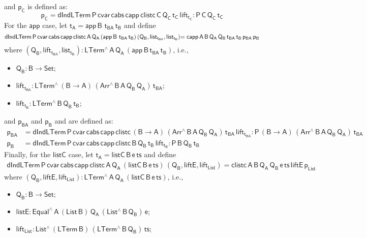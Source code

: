 \documentclass[9pt]{entcs} \usepackage{entcsmacro}
\begin{document}
and $\mathsf{p_C}$ is defined as:
\[
  \mathsf{p_C =  dIndLTerm\,P\,cvar\,cabs \,capp \,clistc\, C\, Q_C\, t_C\, lift_{t_C}  : P \, C\, Q_C \, t_C }
\]
For the $\mathsf{app}$ case, let $\mathsf{t_A = app \,B \,\,t_{BA} \, t_B} $ and define
\[
  \mathsf{dIndLTerm \, P\, cvar \, cabs\, capp\, clistc \, A\, Q_A\,  (app \,B \,\,t_{BA} \, t_B)\, (Q_B , list_{t_{BA}}, list_{t_B})} \\
  \mathsf{= capp\,A\,B\,Q_A\, Q_B\, t_{BA}\, t_B\, p_{BA} \, p_B}
\]
where $\mathsf{(Q_B , lift_{t_{BA}}, list_{t_B}) : LTerm^{\wedge}\, A\, Q_A\, (app \,B \,t_{BA} \, t_B)}$, i.e.,
\begin{itemize}
  \item $\mathsf{Q_B : B \to Set}$;
  \item $\mathsf{lift_{t_{BA}}: LTerm^{\wedge} \, (B \to A)\, (Arr^{\wedge} \, B\, A\, Q_B \, Q_A)\, t_{BA}}$;
  \item $\mathsf{lift_{t_B}: LTerm^{\wedge} \, B\, Q_B\, t_B}$;
\end{itemize}
and $\mathsf{p_{BA}}$ and $\mathsf{p_B}$
and are defined as:
\begin{align*}
  \mathsf{p_{BA}} &= \mathsf{dIndLTerm\,P\,cvar\,cabs \,capp \,clistc\, (B \to A)\,(Arr^{\wedge} \, B\, A\, Q_B \, Q_A) \, t_{BA}\, lift_{t_{BA}}
  : P \, (B \to A)\, (Arr^{\wedge} \, B\, A\, Q_B \, Q_A) \, t_{BA} } \\
  \mathsf{p_B} &= \mathsf{dIndLTerm\,P\,cvar\,cabs \,capp \,clistc\, B\, Q_B\, t_B\, lift_{t_B}  : P \, B\, Q_B \, t_B } 
\end{align*}
Finally, for the $\mathsf{listC}$ case, let $\mathsf{t_A = listC \,B \,e \, ts}$ and define
\begin{multline*}
  \mathsf{dIndLTerm \, P\, cvar \, cabs\, capp\, clistc \, A\, Q_A\, (listC \,B \,e \, ts) \, (Q_B , liftE, lift_{List})
  = clistc \,A\,B\,Q_A\, Q_B\, e\, ts\, liftE\, p_{List} }
\end{multline*}
where $\mathsf{(Q_B , liftE, lift_{List}): LTerm^{\wedge}\, A\, Q_A\, (listC \,B \,e \, ts)}$, i.e.,
\begin{itemize}
  \item $\mathsf{Q_B : B \to Set}$;
  \item $\mathsf{listE : Equal^{\wedge}\, A\, (List\,B)\, Q_A\, (List^{\wedge}\, B\, Q_B)\, e}$;
  \item $\mathsf{lift_{List}: List^{\wedge} \, (LTerm\, B) \, (LTerm^{\wedge}\, B\, Q_B) \, ts}$;
\end{itemize}
\end{document}
